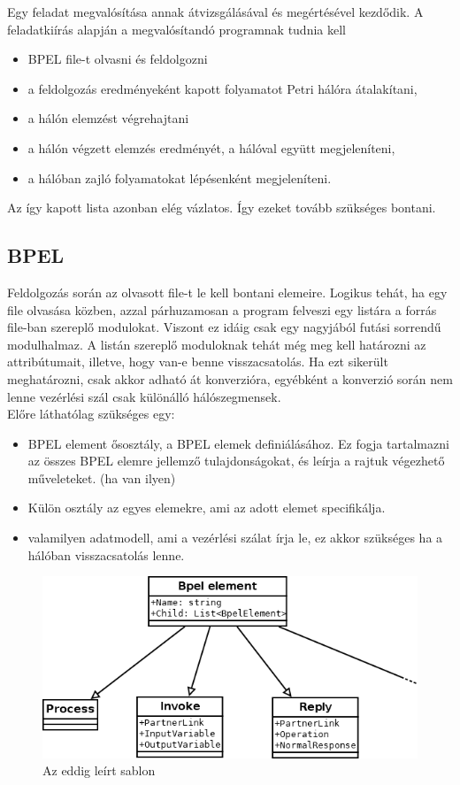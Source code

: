 Egy feladat megvalósítása annak átvizsgálásával és megértésével kezdődik. A feladatkiírás alapján a megvalósítandó programnak tudnia kell
\begin{itemize}
\item BPEL file-t olvasni és feldolgozni
\item a feldolgozás eredményeként kapott folyamatot Petri hálóra átalakítani,
\item a hálón elemzést végrehajtani
\item a hálón végzett elemzés eredményét, a hálóval együtt megjeleníteni,
\item a hálóban zajló folyamatokat lépésenként megjeleníteni.
\end{itemize}
Az így kapott lista azonban elég vázlatos. Így ezeket tovább szükséges bontani. 

\subsection{BPEL}
Feldolgozás során az olvasott file-t le kell bontani elemeire. Logikus tehát, ha egy file olvasása közben, azzal párhuzamosan a program felveszi egy listára a forrás file-ban szereplő modulokat. Viszont ez idáig  csak egy nagyjából futási sorrendű modulhalmaz. A listán szereplő moduloknak tehát még meg kell határozni az attribútumait, illetve, hogy van-e benne visszacsatolás. Ha ezt sikerült meghatározni, csak akkor adható át konverzióra, egyébként a konverzió során nem lenne vezérlési szál csak különálló hálószegmensek.\\
Előre láthatólag szükséges egy: 
\begin{itemize}
\item BPEL element ősosztály, a  BPEL elemek definiálásához. Ez fogja tartalmazni az összes BPEL elemre jellemző tulajdonságokat, és leírja a rajtuk végezhető műveleteket. (ha van ilyen)
\item Külön osztály az egyes elemekre, ami az adott elemet specifikálja. 
\item valamilyen adatmodell, ami a vezérlési szálat írja le, ez akkor szükséges ha a hálóban visszacsatolás lenne. 
\end{itemize} 
\begin{figure}[h!]
\centering
\includegraphics[scale=0.5]{images/BpelClass.png}
\caption{Az eddig leírt sablon}
\label{fig:bpelclass}
\end{figure}

